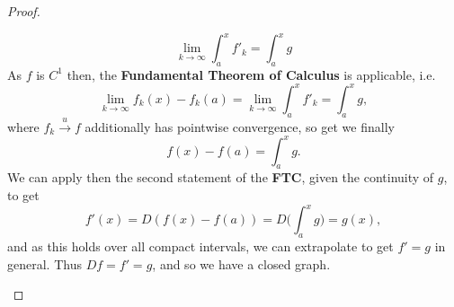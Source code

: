 \documentclass[12pt]{article}
\newenvironment{ex}[2][Exercise]{\begin{trivlist}
\item[\hskip \labelsep {\bfseries #1}\hskip \labelsep {\bfseries #2.}]}{\end{trivlist}}
\begin{document}
\begin{ex}{3}
\begin{enumerate}[label=(\alph*)]
\begin{proof}
\begin{enumerate}[label=(\roman*)]
            $$\underset{k \rightarrow \infty}{\lim} \int_a^x f'_k = \int_a^x g$$
            As $f$ is $C^1$ then, the \textbf{Fundamental Theorem of Calculus} is applicable, i.e. 
            $$\underset{k \rightarrow \infty}{\lim} f_k(x) - f_k(a) = \underset{k \rightarrow \infty}{\lim} \int_a^x f'_k = \int_a^x g,$$
            where $f_k \xrightarrow{u} f$ additionally has pointwise convergence, so get we finally 
            $$f(x) - f(a) = \int_a^x g.$$
            We can apply then the second statement of the \textbf{FTC}, given the continuity of $g$, to get
            $$f'(x) =  D(f(x) - f(a)) = D \Big ( \int_a^x g \Big ) = g(x),$$
            and as this holds over all compact intervals, we can extrapolate to get $f' = g$ in general. Thus $Df = f' = g$, and so we have a closed graph.
            \end{enumerate}
        \end{proof}
    \end{enumerate}
\end{ex}
\end{document}
